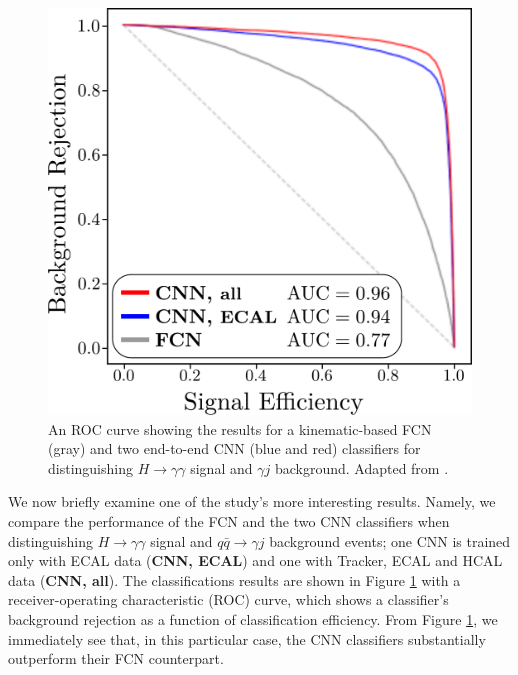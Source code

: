 \documentclass[11pt, a4paper]{article}
\begin{document}
\begin{figure}
    \centering
    \includegraphics[width=\linewidth]{raster/raster-svg/roc.pdf}
    \vspace{-8mm}
    \null \hspace{10mm}\caption{An ROC curve showing the results for a kinematic-based FCN (gray) and two end-to-end CNN (blue and red) classifiers for distinguishing $ H \to \gamma \gamma $ signal and $ \gamma j $ background.
    Adapted from \cite{andrews-higgs}.}
    \label{fig:andrews-roc}
\end{figure}

We now briefly examine one of the study's more interesting results.
Namely, we compare the performance of the FCN and the two CNN classifiers when distinguishing $ H \to \gamma \gamma $ signal and $ q \bar{q} \to \gamma j $ background events; one CNN is trained only with ECAL data (\textbf{CNN, \small{ECAL}}) and one with Tracker, ECAL and HCAL data (\textbf{CNN, \small{all}}).
The classifications results are shown in Figure \ref{fig:andrews-roc} with a receiver-operating characteristic (ROC) curve, which shows a classifier's background rejection as a function of classification efficiency.
From Figure \ref{fig:andrews-roc}, we immediately see that, in this particular case, the CNN classifiers substantially outperform their FCN counterpart.
\end{document}
